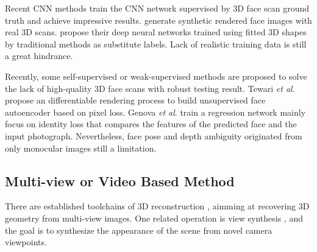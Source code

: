 \documentclass[runningheads]{llncs}
\newcommand{\etal}{\textit{et al}.}
\begin{document}
Recent CNN methods
\cite{dataset_aflw20003D_300WLP_zhu2016face,super_fit_volu_jackson2017large,super_fit_endtoend_iter_tuan2017regressing,super_fiting_liu2018disentangling,super_fit_tran2018extreme,super_fit_volu_exp_feng2018joint,super_fit_yi2019mmface,unsuper_tran2019towards,super_chen2019photo,super_zeng2019df2net,super_review3_galteri2019deep,super_syn_endtoend_dou2017end,super_syn_guo2018cnn} train the CNN network supervised by 3D face scan ground truth and achieve impressive results. \cite{super_syn_iter_richardson20163d,super_syn_endtoend_dou2017end,super_syn_guo2018cnn} generate synthetic rendered face images with real 3D scans.
\cite{super_fit_volu_jackson2017large,super_fit_endtoend_iter_tuan2017regressing,super_fiting_liu2018disentangling,super_fit_tran2018extreme,super_fit_volu_exp_feng2018joint,super_fit_yi2019mmface} propose their deep neural networks trained using fitted 3D shapes by traditional methods as substitute labels.
Lack of realistic training data is still a great hindrance.

Recently, some self-supervised or weak-supervised methods are proposed \cite{unsuper_richardson2017learning,unsuper_tewari2017mofa,unsuper_tran2018nonlinear,unsuper_tewari2018self,unsuper_genova2018unsupervised,unsuper_mul_sanyal2019learning_ring,unsuper_tran2019towards,unsuper_yoon2019self,unsuper_zhou2019dense} to solve the lack of high-quality 3D face scans with robust testing result.
Tewari \etal \cite{unsuper_tewari2017mofa} propose an differentiable rendering process to build unsupervised face autoencoder based on pixel loss.
Genova \etal \cite{unsuper_genova2018unsupervised} train a regression network mainly focus on identity loss that compares the features of the predicted face and the input photograph. 
Nevertheless, face pose and depth ambiguity originated from only monocular images still a limitation.


\subsection{Multi-view or Video Based Method} 

There are established toolchains of 3D reconstruction \cite{sfm_furukawa2010towards,sfm_wu2011visualsfm,sfm_schoenberger2016sfm,mvs_schoenberger2016mvs}, aimming at recovering 3D geometry from multi-view images.
One related operation is view synthesis \cite{warp_chen1993view,warp_seitz1996view,warp_fitzgibbon2005image}, and the goal is to synthesize the appearance of the scene from novel camera viewpoints.
\end{document}

